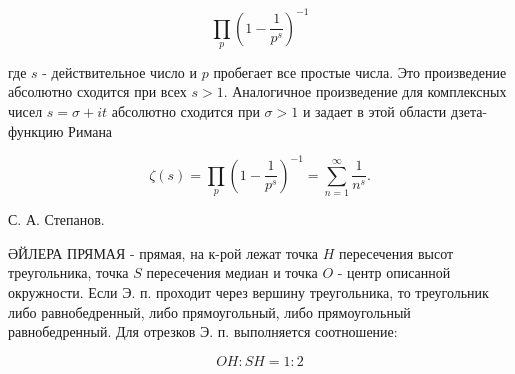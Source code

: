 \documentclass[10pt]{article}
\begin{document}
\[

\prod_{p}\left(1-\frac{1}{p^{s}}\right)^{-1}

\]



где $s$ - действительное число и $p$ пробегает все простые числа. Это произведение абсолютно сходится при всех $s>1$. Аналогичное произведение для комплексных чисел $s=\sigma+i t$ абсолютно сходится при $\sigma>1$ и задает в этой области дзета-функцию Римана



\[

\zeta(s)=\prod_{p}\left(1-\frac{1}{p^{s}}\right)^{-1}=\sum_{n=1}^{\infty} \frac{1}{n^{s}} .

\]



С. А. Степанов.



ӘЙЛЕРА ПРЯМАЯ - прямая, на к-рой лежат точка $H$ пересечения высот треугольника, точка $S$ пересечения медиан и точка $O$ - центр описанной окружности. Если Э. п. проходит через вершину треугольника, то треугольник либо равнобедренный, либо прямоугольный, либо прямоугольный равнобедренный. Для отрезков Э. п. выполняется соотношение:



\[

O H: S H=1: 2

\]
\end{document}
